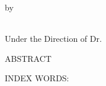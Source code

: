 \pagestyle{empty}
\begin{center}



\vspace{1in}
by\\
\vspace{1in}

\\

\vspace{1.8in}
Under the Direction of Dr. \\
\vspace{.7in}

\newpage
ABSTRACT\\
\bigskip
\end{center}

\begin{doublespace}


\end{doublespace}

\begin{singlespace}

\noindent INDEX WORDS:
\hspace{0.2in}
\parbox[t]{5 in}{}

\end{singlespace}
